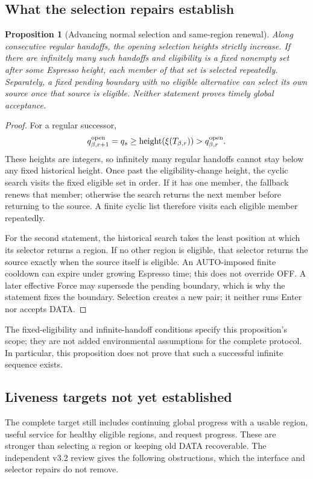 \documentclass[11pt,a4paper]{article}
\newtheorem{proposition}[proposition]{Proposition}
\newcounter{protocol}
\begin{document}
\subsection{What the selection repairs establish}
\label{sec:selection-repairs}
\begin{proposition}[Advancing normal selection and same-region renewal]
\label{prop:selection-repairs}
Along consecutive regular handoffs, the opening selection heights strictly
increase. If there are infinitely many such handoffs and eligibility is
a fixed nonempty set after some Espresso height, each member of that set
is selected repeatedly. Separately, a fixed pending boundary with no
eligible alternative can select its own source once that source is
eligible. Neither statement proves timely global acceptance.
\end{proposition}
\begin{proof}
For a regular successor,
\[
 q^{\rm open}_{\beta,r+1}
 =q_s\ge \operatorname{height}(\xi(T_{\beta,r}))
 >q^{\rm open}_{\beta,r}.
\]
These heights are integers, so infinitely many regular handoffs cannot
stay below any fixed historical height. Once past the eligibility-change
height, the cyclic search visits the fixed eligible set in order. If it
has one member, the fallback renews that member; otherwise the search
returns the next member before returning to the source. A finite cyclic
list therefore visits each eligible member repeatedly.

For the second statement, the historical search takes the least position
at which its selector returns a region. If no other region is eligible,
that selector returns the source exactly when the source itself is eligible.
An AUTO-imposed finite cooldown can expire under growing Espresso time;
this does not override OFF. A later effective Force may supersede the
pending boundary, which is why the statement fixes the boundary.
Selection creates a new pair; it neither runs Enter nor accepts DATA.
\end{proof}

The fixed-eligibility and infinite-handoff conditions specify this
proposition's scope; they are not added environmental assumptions for
the complete protocol. In particular, this proposition does not prove
that such a successful infinite sequence exists.

\subsection{Liveness targets not yet established}
\label{sec:liveness-counterexamples}
The complete target still includes continuing global progress with a
usable region, useful service for healthy eligible regions, and request
progress. These are stronger than selecting a region or keeping old
DATA recoverable. The independent v3.2 review gives the following
obstructions, which the interface and selector repairs do not remove.
\end{document}
